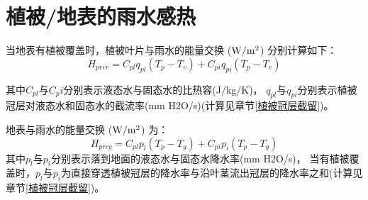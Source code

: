 \section{植被/地表的雨水感热}\label{植被地表的雨水感热}
当地表有植被覆盖时，植被叶片与雨水的能量交换 ($\rm W/m^2$) 分别计算如下：
\begin{equation}
H_{p r c v}=C_{p l} q_{p l}\left(T_{p}-T_{v}\right)+C_{p i} q_{p i}\left(T_{p}-T_{v}\right)
\end{equation}

其中$C_{pl}$与$C_pi$分别表示液态水与固态水的比热容(J/kg/K)，
$q_{pl}$与$q_{pi}$分别表示植被冠层对液态水和固态水的截流率(mm H2O/s)(计算见章节\ref{植被冠层截留})。


地表与雨水的能量交换 ($\rm W/m^2$) 为：
\begin{equation}
H_{p r c g}=C_{p l} p_{l}\left(T_{p}-T_{g}\right)+C_{p i} p_{i}\left(T_{p}-T_{g}\right)
\end{equation}
其中$p_l$与$p_i$分别表示落到地面的液态水与固态水降水率(mm H2O/s)，
当有植被覆盖时，$p_l$与$p_i$为直接穿透植被冠层的降水率与沿叶茎流出冠层的降水率之和(计算见章节\ref{植被冠层截留})。

